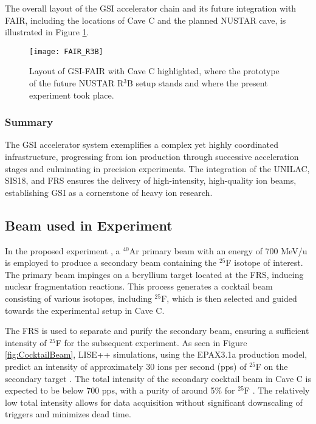 The overall layout of the GSI accelerator chain and its future integration with FAIR, including the locations of Cave C and the planned NUSTAR cave, is illustrated in Figure \ref{fig:GSI_FAIR_R3B}.

\begin{figure}
	\centering
	\texttt{[image: FAIR\_R3B]}
	\caption{Layout of GSI-FAIR with Cave C highlighted, where the prototype of the future NUSTAR R$^3$B setup stands and where the present experiment took place.}
	\label{fig:GSI_FAIR_R3B}
\end{figure}


\subsubsection{Summary}

The GSI accelerator system exemplifies a complex yet highly coordinated infrastructure, progressing from ion production through successive acceleration stages and culminating in precision experiments. The integration of the UNILAC, SIS18, and \gls{FRS} ensures the delivery of high-intensity, high-quality ion beams, establishing GSI as a cornerstone of heavy ion research.



\subsection{Beam used in Experiment}

In the proposed experiment \cite{panin2024neutron}, a $^{40}$Ar primary beam with an energy of 700 MeV/u is employed to produce a secondary beam containing the $^{25}$F isotope of interest. The primary beam impinges on a beryllium target located at the \gls{FRS}, inducing nuclear fragmentation reactions. This process generates a cocktail beam consisting of various isotopes, including $^{25}$F, which is then selected and guided towards the experimental setup in Cave C.

The \gls{FRS} is used to separate and purify the secondary beam, ensuring a sufficient intensity of $^{25}$F for the subsequent experiment. As seen in Figure \ref{fig:CocktailBeam}, LISE++ simulations, using the EPAX3.1a production model, predict an intensity of approximately 30 ions per second (pps) of $^{25}$F on the secondary target \cite{panin2024neutron}. The total intensity of the secondary cocktail beam in Cave C is expected to be below 700 pps, with a purity of around 5\% for $^{25}$F \cite{panin2024neutron}. The relatively low total intensity allows for data acquisition without significant downscaling of triggers and minimizes dead time.

